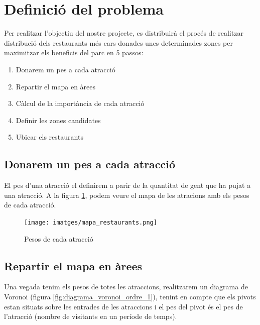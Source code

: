 \documentclass[12pt]{article}
\begin{document}
\clearpage
\section{Definició del problema}
Per realitzar l'objectiu del nostre projecte, es distribuirà el procés de realitzar distribució dels restaurants més cars donades unes determinades zones per maximitzar els beneficis del parc en 5 passos:
\begin{enumerate}
	\item Donarem un pes a cada atracció
	\item Repartir el mapa en àrees
	\item Càlcul de la importància de cada atracció
	\item Definir les zones candidates
	\item Ubicar els restaurants
\end{enumerate}

\subsection{Donarem un pes a cada atracció}
El pes d'una atracció el definirem a parir de la quantitat de gent que ha pujat a una atracció. A la figura \ref{fig:mapa_areas}, podem veure el mapa de les atracions amb els pesos de cada atracció.

\begin{figure}[h!]
	\centering
	\texttt{[image: imatges/mapa\_restaurants.png]}\par\vspace{1cm}
	\caption{Pesos de cada atracció}
	\label{fig:mapa_areas}
\end{figure}

\subsection{Repartir el mapa en àrees}
Una vegada tenim els pesos de totes les atraccions, realitzarem un diagrama de Voronoi (figura \ref{fig:diagrama_voronoi_ordre_1}), tenint en compte que els pivots estan situats sobre les entrades de les atraccions i el pes del pivot és el pes de l’atracció (nombre de visitants en un període de temps).
		
\end{document}
